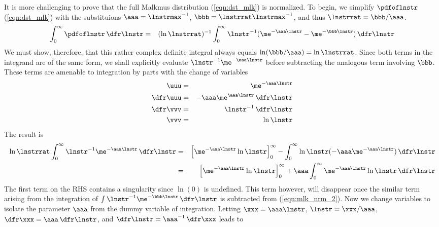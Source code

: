 \documentclass[12pt]{article}
\begin{document}
It is more challenging to prove that the full Malkmus distribution
(\ref{eqn:dst_mlk}) is normalized. 
To begin, we simplify $\pdfoflnstr$ (\ref{eqn:dst_mlk}) with the
substituions $\aaa = \lnstrmax^{-1}$, $\bbb = \lnstrrat
\lnstrmax^{-1}$, and thus $\lnstrrat = \bbb/\aaa$.
\begin{eqnarray}
\int_{0}^{\infty} \pdfoflnstr \,\dfr\lnstr 
& = &
(\ln \lnstrrat)^{-1} \int_{0}^{\infty} 
\lnstr^{-1} ( \me^{-\aaa \lnstr} - \me^{-\bbb \lnstr} ) 
\,\dfr\lnstr 
\label{eqn:mlk_nrm_1}
\end{eqnarray}
We must show, therefore, that this rather complex definite integral
always equals $\ln (\bbb/\aaa) = \ln \lnstrrat$. 
Since both terms in the integrand are of the same form,
we shall explicitly evaluate $\lnstr^{-1} \me^{-\aaa \lnstr}$
before subtracting the analogous term involving $\bbb$.
These terms are amenable to integration by parts with the change of
variables 
\begin{eqnarray}
\uuu & = & \me^{-\aaa\lnstr} \nonumber \\
\dfr\uuu & = & -\aaa \me^{\aaa\lnstr} \,\dfr\lnstr \nonumber \\
\dfr\vvv & = & \lnstr^{-1} \,\dfr\lnstr \nonumber \\
\vvv & = & \ln \lnstr
\label{eqn:cov_mlk}
\end{eqnarray}
The result is
\begin{eqnarray}
\ln \lnstrrat \int_{0}^{\infty} \lnstr^{-1} \me^{-\aaa \lnstr} \,\dfr\lnstr 
& = &
\left[ \me^{-\aaa\lnstr} \ln \lnstr \right]_{0}^{\infty}
- \int_{0}^{\infty} \ln \lnstr (-\aaa \me^{-\aaa\lnstr}) \,\dfr\lnstr
\nonumber \\
& = &
\left[ \me^{-\aaa\lnstr} \ln \lnstr \right]_{0}^{\infty}
+ \aaa \int_{0}^{\infty} \me^{-\aaa\lnstr} \ln \lnstr \,\dfr\lnstr
\nonumber
\label{eqn:mlk_nrm_2}
\end{eqnarray}
The first term on the RHS contains a singularity since $\ln (0)$ is
undefined. 
This term however, will disappear once the similar term arising from
the integration of $\int \lnstr^{-1} \me^{-\bbb \lnstr} \,\dfr\lnstr$
is subtracted from (\ref{eqn:mlk_nrm_2}).
Now we change variables to isolate the parameter $\aaa$ from the dummy
variable of integration. 
Letting $\xxx = \aaa\lnstr$, $\lnstr = \xxx/\aaa$, $\dfr\xxx =
\aaa\,\dfr\lnstr$, and $\dfr\lnstr = \aaa^{-1}\,\dfr\xxx$ leads to
\end{document}
